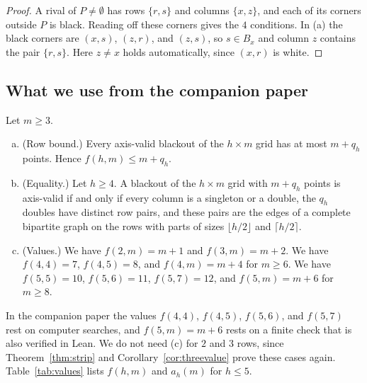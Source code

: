 \begin{proof}
A rival of $P\ne\emptyset$ has rows $\{r,s\}$ and columns $\{x,z\}$, and each of
its corners outside $P$ is black. Reading off these corners gives the $4$
conditions. In (a) the black corners are $(x,s)$, $(z,r)$, and $(z,s)$, so
$s\in B_x$ and column $z$ contains the pair $\{r,s\}$. Here $z\ne x$ holds
automatically, since $(x,r)$ is white.
\end{proof}

\subsection{What we use from the companion paper}

\begin{theorem}\label{thm:imports}
Let $m\ge3$.
\begin{enumerate}[(a)]
\item \textup{(Row bound.)} Every axis-valid blackout of the $h\times m$ grid has
at most $m+q_h$ points. Hence $f(h,m)\le m+q_h$.
\item \textup{(Equality.)} Let $h\ge4$. A blackout of the $h\times m$ grid with
$m+q_h$ points is axis-valid if and only if every column is a singleton or a
double, the $q_h$ doubles have distinct row pairs, and these pairs are the edges
of a complete bipartite graph on the rows with parts of sizes $\lfloor h/2\rfloor$
and $\lceil h/2\rceil$.
\item \textup{(Values.)} We have $f(2,m)=m+1$ and $f(3,m)=m+2$. We have
$f(4,4)=7$, $f(4,5)=8$, and $f(4,m)=m+4$ for $m\ge6$. We have $f(5,5)=10$,
$f(5,6)=11$, $f(5,7)=12$, and $f(5,m)=m+6$ for $m\ge8$.
\end{enumerate}
\end{theorem}

In the companion paper the values $f(4,4)$, $f(4,5)$, $f(5,6)$, and $f(5,7)$
rest on computer searches, and $f(5,m)=m+6$ rests on a finite check that is
also verified in Lean. We do not need (c) for $2$ and $3$ rows, since
Theorem~\ref{thm:strip} and Corollary~\ref{cor:threevalue} prove these cases
again. Table~\ref{tab:values} lists $f(h,m)$ and $a_h(m)$ for $h\le5$.


